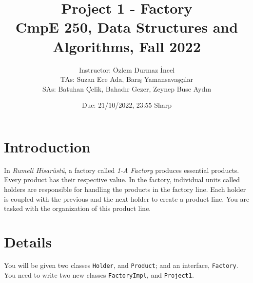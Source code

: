 \documentclass[10pt]{article}
\title{\vspace{-1cm} \Huge Project 1 - Factory\\ \LARGE CmpE 250, Data Structures and Algorithms, Fall 2022 }
\author{
  Instructor: Özlem Durmaz \.{I}ncel\\
  TAs: Suzan Ece Ada, Bar{\i}\c{s} Yamansavaşç{\i}lar\\
  SAs:  Batuhan \c{C}elik, Bahad{\i}r Gezer, Zeynep Buse Ayd{\i}n
}
\date{Due: 21/10/2022, 23:55 Sharp}
\begin{document}
  \maketitle
  \vspace{0.05cm}
  
  \section{Introduction}

In \textit{Rumeli Hisarüstü}, a factory called \textit{1-A Factory} produces essential products. Every product has their respective value. In the factory, individual units called holders are responsible for handling the products in the factory line. Each holder is coupled with the previous and the next holder to create a product line. You are tasked with the organization of this product line.

\section{Details}

 You will be given two classes \texttt{Holder}, and \texttt{Product}; and an interface, \texttt{Factory}. You need to write two new classes \texttt{FactoryImpl}, and \texttt{Project1}. 
\end{document}
